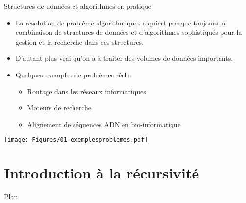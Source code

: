 \begin{frame}{Structures de données et algorithmes en pratique}

\begin{itemize}
\item La résolution de problème algorithmiques requiert presque
  toujours la combinaison de structures de données et d'algorithmes
  sophistiqués pour la gestion et la recherche dans ces structures.
\item D'autant plus vrai qu'on a à traiter des volumes de données importants.
\item Quelques exemples de problèmes réels:
\begin{itemize}
\item Routage dans les réseaux informatiques
\item Moteurs de recherche
\item Alignement de séquences ADN en bio-informatique
\end{itemize}
\end{itemize}
\centerline{\texttt{[image: Figures/01-exemplesproblemes.pdf]}}

\end{frame}

\section{Introduction à la récursivité}

\begin{frame}{Plan}

\tableofcontents
\end{frame}


